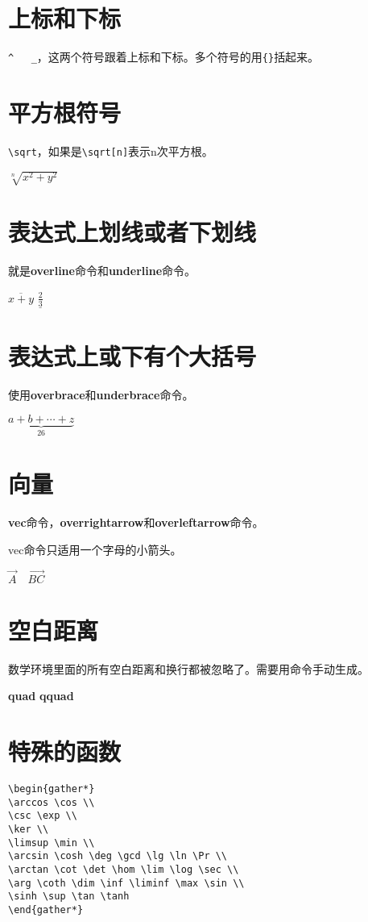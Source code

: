 \documentclass[11pt,oneside]{book}
\begin{document}
\begin{common-format}
\section{上标和下标}
\verb+^   _+，这两个符号跟着上标和下标。多个符号的用\verb+{}+括起来。

\section{平方根符号}
\verb+\sqrt+，如果是\verb+\sqrt[n]+表示n次平方根。

$\sqrt[n]{x^2+y^2}$

\section{表达式上划线或者下划线}
就是\textbf{overline}命令和\textbf{underline}命令。

$\overline{x+y}$  $\underline{\frac{2}{3}}$

\section{表达式上或下有个大括号}
使用\textbf{overbrace}和\textbf{underbrace}命令。

$\underbrace{ a+b+\cdots+z }_{26}$

\section{向量}
\textbf{vec}命令，\textbf{overrightarrow}和\textbf{overleftarrow}命令。

vec命令只适用一个字母的小箭头。

$\vec {A} \quad \overrightarrow{BC}$

\section{空白距离}
数学环境里面的所有空白距离和换行都被忽略了。需要用命令手动生成。

\textbf{quad}  \textbf{qquad}


\section{特殊的函数}
\begin{Verbatim}
\begin{gather*}
\arccos \cos \\
\csc \exp \\
\ker \\
\limsup \min \\ 
\arcsin \cosh \deg \gcd \lg \ln \Pr \\ 
\arctan \cot \det \hom \lim \log \sec \\
\arg \coth \dim \inf \liminf \max \sin \\
\sinh \sup \tan \tanh
\end{gather*}
\end{Verbatim}


\end{common-format}
\end{document}
